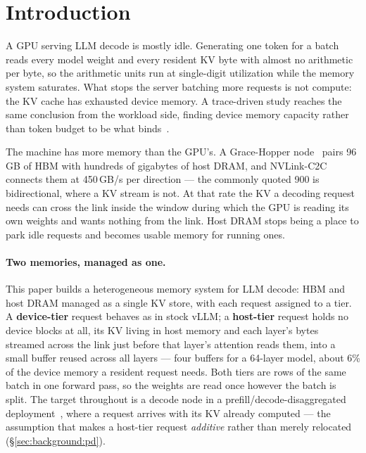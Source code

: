 
\section{Introduction}
\label{sec:intro}

A GPU serving LLM decode is mostly idle. Generating one token for a batch reads every
model weight and every resident KV byte with almost no arithmetic per byte, so the
arithmetic units run at single-digit utilization while the memory system saturates.
What stops the server batching more requests is not compute: the KV cache has
exhausted device memory. A trace-driven study reaches the same conclusion from the
workload side, finding device memory capacity rather than token budget to be what
binds~\cite{bottlenecks}.

The machine has more memory than the GPU's. A Grace-Hopper
node~\cite{gracehopper} pairs 96\,GB of HBM with hundreds of gigabytes of host DRAM,
and NVLink-C2C connects them at 450\,GB/s per direction --- the commonly quoted 900
is bidirectional, where a KV stream is not. At that rate the KV a decoding request
needs can cross the link inside the window during which the GPU is reading its own
weights and wants nothing from the link. Host DRAM stops being a place to park idle
requests and becomes usable memory for running ones.

\paragraph{Two memories, managed as one.} This paper builds a heterogeneous memory
system for LLM decode: HBM and host DRAM managed as a single KV store, with each
request assigned to a tier. A \textbf{device-tier} request behaves as in stock vLLM;
a \textbf{host-tier} request holds no device blocks at all, its KV living in host
memory and each layer's bytes streamed across the link just before that layer's
attention reads them, into a small buffer reused across all layers --- four buffers
for a 64-layer model, about 6\% of the device memory a resident request needs. Both
tiers are rows of the same batch in one forward pass, so the weights are read once
however the batch is split. The target throughout is a decode node in a
prefill/decode-disaggregated deployment~\cite{distserve,splitwise,mooncake}, where a
request arrives with its KV already computed --- the assumption that makes a
host-tier request \emph{additive} rather than merely relocated
(\S\ref{sec:background:pd}).

